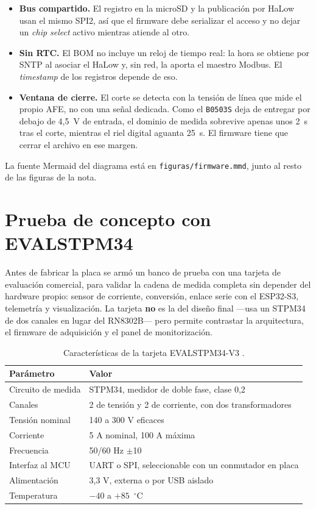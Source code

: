 \documentclass[11pt,a4paper]{article}
\newcommand{\pct}{\text{\char37}}
\begin{document}
\begin{itemize}
  \item \textbf{Bus compartido.} El registro en la microSD y la publicación por
        HaLow usan el mismo SPI2, así que el firmware debe serializar el acceso
        y no dejar un \emph{chip select} activo mientras atiende al otro.
  \item \textbf{Sin RTC.} El BOM no incluye un reloj de tiempo real: la hora se
        obtiene por SNTP al asociar el HaLow y, sin red, la aporta el maestro
        Modbus. El \emph{timestamp} de los registros depende de eso.
  \item \textbf{Ventana de cierre.} El corte se detecta con la tensión de línea
        que mide el propio AFE, no con una señal dedicada. Como el
        \texttt{B0503S} deja de entregar por debajo de 4,5~V de entrada, el
        dominio de medida sobrevive apenas unos 2~s tras el corte, mientras el
        riel digital aguanta 25~s. El firmware tiene que cerrar el archivo en ese
        margen.
\end{itemize}

\noindent La fuente Mermaid del diagrama está en
\texttt{figuras/firmware.mmd}, junto al resto de las figuras de la nota.

\section{Prueba de concepto con EVALSTPM34}
\label{sec:poc}

Antes de fabricar la placa se armó un banco de prueba con una tarjeta de
evaluación comercial, para validar la cadena de medida completa sin depender
del hardware propio: sensor de corriente, conversión, enlace serie con el
ESP32-S3, telemetría y visualización. La tarjeta \textbf{no} es la del diseño
final —usa un STPM34 de dos canales en lugar del RN8302B— pero permite
contrastar la arquitectura, el firmware de adquisición y el panel de
monitorización.

\begin{table}[H]
\centering
\caption{Características de la tarjeta EVALSTPM34-V3 \cite{stpm34}.}
\label{tab:poc}
\small
\begin{tabularx}{\textwidth}{@{}l X@{}}
\toprule
\textbf{Parámetro} & \textbf{Valor} \\
\midrule
Circuito de medida & STPM34, medidor de doble fase, clase 0,2 \\
Canales & 2 de tensión y 2 de corriente, con dos transformadores \\
Tensión nominal & 140 a 300 V eficaces \\
Corriente & 5 A nominal, 100 A máxima \\
Frecuencia & 50/60 Hz $\pm$10\,\pct \\
Interfaz al MCU & UART o SPI, seleccionable con un conmutador en placa \\
Alimentación & 3,3 V, externa o por USB aislado \\
Temperatura & $-40$ a $+85$~$^\circ$C \\
\bottomrule
\end{tabularx}
\end{table}
\end{document}
